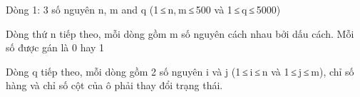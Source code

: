Dòng 1: 3 số nguyên n, m and q (1 ≤ n, m ≤ 500 và 1 ≤ q ≤ 5000)

Dòng thứ n tiếp theo, mỗi dòng gồm m số nguyên cách nhau bởi dấu cách. Mỗi số được gán là 0 hay 1 

Dòng q tiếp theo, mỗi dòng gồm 2 số nguyên i và j (1 ≤ i ≤ n và 1 ≤ j ≤ m), chỉ số hàng và chỉ số cột của ô phải thay đổi trạng thái.